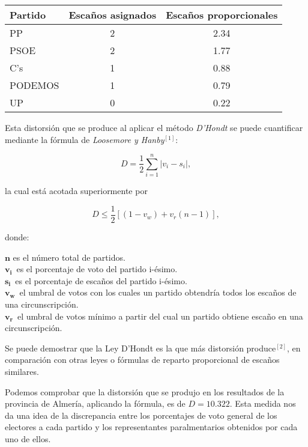 \documentclass[11pt]{article}
\newcommand\console[1]{{\inconsolata #1}}
\begin{document}
	 \console{
	 
	 \begin{center}
	 \begin{tabular}{l|c|c}
	 \textbf{Partido} & \textbf{Escaños asignados} & \textbf{Escaños proporcionales}\\
	 \hline
	 PP & 2 & 2.34\\
	 PSOE & 2 & 1.77\\
	 C's & 1 & 0.88\\
	 PODEMOS & 1 & 0.79\\
	 UP & 0 & 0.22
	 \end{tabular}
	 \end{center}
	 }
	 	 
	 Esta distorsión que se produce al aplicar el método \textit{D'Hondt} se puede cuantificar mediante la fórmula de \textit{Loosemore y Hanby}$^{[1]}$:
	 
	 \vspace{-0.5em}
	 $$D = \frac{1}{2} \sum_{i=1}^n |v_i - s_i|,$$
	 
	 \vspace{-0.5em}
	 la cual está acotada superiormente por
	 
	 \vspace{-0.5em}
	 $$D \le \frac{1}{2} \left[ (1 - v_w) + v_r(n-1) \right],$$
	 
	 \vspace{-0.5em}
	 donde:
	 
	 \enlargethispage{2\baselineskip}
	 
	  $\boldsymbol{n}$ es el número total de partidos.\\
  $\displaystyle \boldsymbol{v_{i}}\,$  es el porcentaje de voto del partido i-ésimo.\\
  $\displaystyle \boldsymbol{s_{i}}\,$  es el porcentaje de escaños del partido i-ésimo.\\
  $\displaystyle \boldsymbol{v_{w}}\,$  el umbral de votos con los cuales un partido obtendría todos los escaños de una circunscripción.\\
  $\displaystyle \boldsymbol{v_{r}}\,$  el umbral de votos mínimo a partir del cual un partido obtiene escaño en una circunscripción.
	 
	 Se puede demostrar que la Ley D'Hondt es la que más distorsión produce$^{[2]}$, en comparación con otras leyes o fórmulas de reparto proporcional de escaños similares.
	 
	 Podemos comprobar que la distorsión que se produjo en los resultados de la provincia de Almería, aplicando la fórmula, es de $D = 10.322$. Esta medida nos da una idea de la discrepancia entre los porcentajes de voto general de los electores a cada partido y los representantes paralmentarios obtenidos por cada uno de ellos.
	
\end{document}
